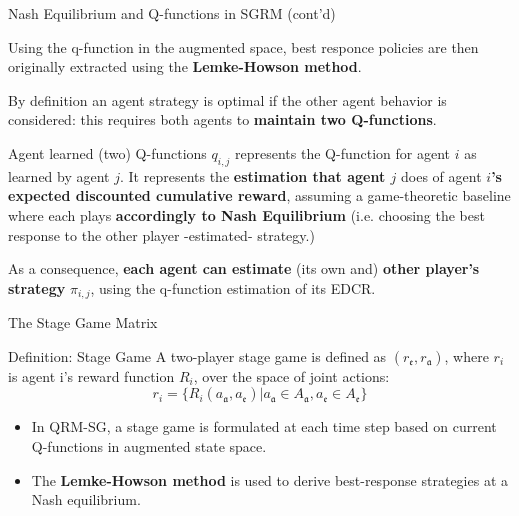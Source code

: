 \documentclass[10pt, aspectratio=169]{beamer}
\newcommand{\evidenzia}[1]{\textcolor{verdeSalvia}{\textbf{#1}}}
\begin{document}
\begin{frame}{Nash Equilibrium and Q-functions in SGRM (cont'd)}

    Using the q-function in the augmented space, best responce policies are then originally extracted using the \evidenzia{Lemke-Howson method}.
    
    By definition an agent strategy is optimal if the other agent behavior is considered: this requires both agents to \evidenzia{maintain two Q-functions}.
    
    \vspace{0.2cm}
    \begin{block}{Agent learned (two) Q-functions}
    $q_{i,j}$ represents the Q-function for agent $i$ as learned by agent $j$.
    {\footnotesize It represents the \evidenzia{estimation that agent $j$} does of agent \evidenzia{$i$'s expected discounted cumulative reward}, assuming a game-theoretic baseline where each plays \evidenzia{accordingly to Nash Equilibrium} (i.e. choosing the best response to the other player -estimated- strategy.)}
    \end{block}
    
    As a consequence, \evidenzia{each agent can estimate} (its own and) \evidenzia{other player's strategy} $\pi_{i,j}$, using the q-function estimation of its EDCR.
\end{frame}

\begin{frame}{The Stage Game Matrix}
    \begin{block}{Definition: Stage Game}
        A two-player stage game is defined as $(r_\mathfrak{e}, r_\mathfrak{a})$, where $r_i$ is agent i's reward function $R_i$, over the space of joint actions:
        \[r_i = \{R_i(a_\mathfrak{a}, a_\mathfrak{e}) | a_\mathfrak{a}\in{A_\mathfrak{a}}, a_\mathfrak{e}\in{A_\mathfrak{e}}\} \]
    \end{block}
    \begin{itemize}
        \item In QRM-SG, a stage game is formulated at each time step based on current Q-functions in augmented state space.
        \item The \textbf{Lemke-Howson method} is used to derive best-response strategies at a Nash equilibrium.
    \end{itemize}
\end{frame}
\end{document}
